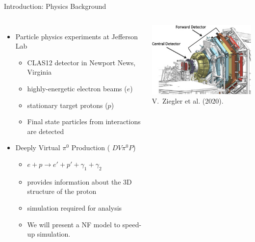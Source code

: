 \documentclass[aspectratio=169]{beamer}
\begin{document}
\begin{frame}{Introduction: Physics Background}

    \begin{columns}
            \begin{itemize}
            \setlength\itemsep{1em}
                \item Particle physics experiments at Jefferson Lab\\
                \begin{itemize}
                    \item CLAS12 detector in Newport News, Virginia
                    \item highly-energetic electron beams ($e$)
                    \item stationary target protons ($p$)
                    \item Final state particles from interactions are detected
                \end{itemize}
                \item Deeply Virtual $\pi^0$ Production ( $DV\pi^0P$)
                \begin{itemize}
                    \item $e + p \rightarrow e' + p' + \gamma_1 + \gamma_2$
                    \item provides information about the 3D structure of the proton
                    \item simulation required for analysis
                    \item We will present a NF model to speed-up simulation.
                \end{itemize}
            \end{itemize}
            
             \centering
            \includegraphics[width=0.26\paperwidth]{images/Detectors/overview.jpg}\\
            V.~Ziegler et al. (2020).
    \end{columns}
\end{frame}
\end{document}
